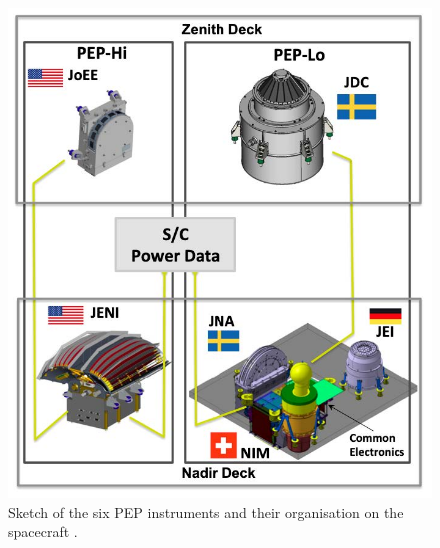 	\begin{figure}[H]
		\centering
		\includegraphics[width=.7\textwidth]{Bilder/PEP_Instruments.jpg}
		\caption{Sketch of the six PEP instruments and their organisation on the spacecraft \cite{PEP_inst}.}
		\label{fig:PEPInst}
	\end{figure}

